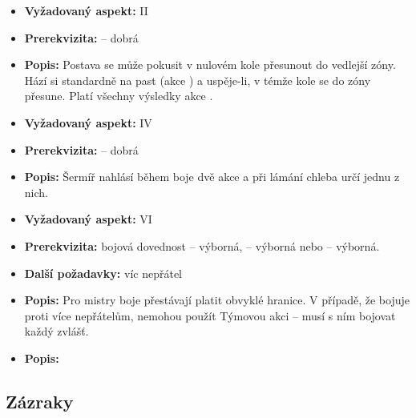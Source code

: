 \documentclass[../main.tex]{subfiles}
\begin{document}
\begin{specialita}
\begin{itemize}
	\item \textbf{Vyžadovaný aspekt:} II
	\item \textbf{Prerekvizita:}  – dobrá
	\item \textbf{Popis:} Postava se může pokusit v nulovém kole přesunout do vedlejší zóny. Hází si standardně na past (akce ) a uspěje-li, v témže kole se do zóny přesune. Platí všechny výsledky akce .
\end{itemize}
\end{specialita}

\begin{specialita}[Předvídavost]
\begin{itemize}
	\item \textbf{Vyžadovaný aspekt:} IV
	\item \textbf{Prerekvizita:}  – dobrá
	\item \textbf{Popis:} Šermíř nahlásí během boje dvě akce a při lámání chleba určí jednu z nich.
\end{itemize}
\end{specialita}

\begin{specialita}
\begin{itemize}
	\item \textbf{Vyžadovaný aspekt:} VI
	\item \textbf{Prerekvizita:} bojová dovednost – výborná,  – výborná nebo  – výborná.
	\item \textbf{Další požadavky:} víc nepřátel
	\item \textbf{Popis:} Pro mistry boje přestávají platit obvyklé hranice. V případě, že bojuje proti více nepřátelům, nemohou použít Týmovou akci – musí s ním bojovat každý zvlášť.
\end{itemize}
\end{specialita}

\begin{specialita}[Sart]
\begin{itemize}
	\item \textbf{Popis:}
\end{itemize}
\end{specialita}


\subsection{Zázraky}
\label{sec:subotam-zazraky}
\end{document}
